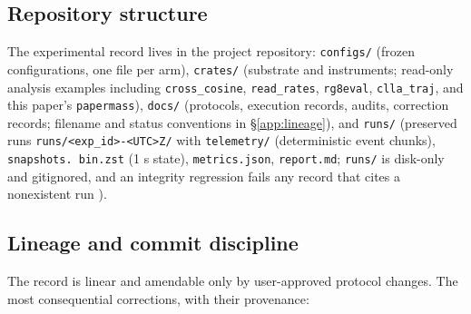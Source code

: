 \subsection{Repository structure}

The experimental record lives in the project repository:
\texttt{configs/} (frozen configurations, one file per arm),
\texttt{crates/} (substrate and instruments; read-only analysis
examples including \texttt{cross\_cosine}, \texttt{read\_rates},
\texttt{rg8eval}, \texttt{clla\_traj}, and this paper's
\texttt{papermass}), \texttt{docs/} (protocols, execution records,
audits, correction records; filename and status conventions in
\S\ref{app:lineage}), and \texttt{runs/} (preserved runs
\texttt{runs/\allowbreak<exp\_id>-\allowbreak<UTC>Z/} with
\texttt{telemetry/} (deterministic event chunks), \texttt{snapshots.
bin.zst} (1 s state), \texttt{metrics.json}, \texttt{report.md};
\texttt{runs/} is disk-only and gitignored, and an integrity regression
fails any record that cites a nonexistent run \cite{overview}).

\subsection{Lineage and commit discipline}

The record is linear and amendable only by user-approved protocol
changes. The most consequential corrections, with their provenance:


